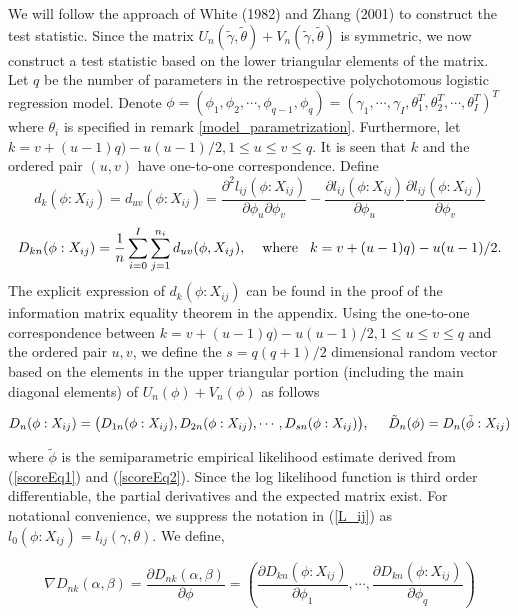 \documentclass[12]{interact}
\theoremstyle{plain}%
\theoremstyle{definition}
\theoremstyle{remark}
\begin{document}
We will follow the approach of White (1982) and Zhang (2001) to
construct the test statistic. Since the matrix
$U_n(\tilde{\gamma},\tilde{\theta})+V_n(\tilde{\gamma},\tilde{\theta})$
is symmetric, we now construct a test statistic based on the lower
triangular elements of the matrix. Let $q$ be the number of
parameters in the retrospective polychotomous logistic regression model. Denote
$\phi=(\phi_1, \phi_2, \cdots, \phi_{q-1}, \phi_q)=(\gamma_1,
\cdots, \gamma_I,\theta_1^T, \theta_2^T, \cdots,
\theta_{I}^T)^T$ where $\theta_i$ is specified in remark \ref{model_parametrization}.
Furthermore, let $k=v+(u-1)q)-u(u-1)/2, 1\le u\le v\le q$. It is seen that $k$ and the ordered pair $(u, v)$ have one-to-one correspondence. Define
\begin{equation}
	d_{k}(\phi: X_{ij})=d_{uv}(\phi: X_{ij})=\frac{\partial^2l_{ij}(\phi:X_{ij})}{\partial
		\phi_u\partial \phi_v}-\frac{\partial
		l_{ij}(\phi:X_{ij})}{\partial\phi_u} \frac{\partial l_{ij}(\phi :
		X_{ij})}{\partial \phi_v}\label{cell-difference}
\end{equation}
$$D_{kn}(\phi:X_{ij})=
\frac{1}{n}\sum_{i=0}^I\sum_{j=1}^{n_i}d_{uv}(\phi, X_{ij}), \hspace{4mm}\mbox{where}\hspace{3mm} k=v+(u-1)q)-u(u-1)/2.$$
The explicit expression of $d_{k}(\phi:X_{ij})$ can be found in the proof of the information matrix equality theorem in the appendix. Using the one-to-one correspondence between $k=v+(u-1)q)-u(u-1)/2, 1\le u\le v\le q$ and the ordered pair $u,v$, we define the $s=q(q+1)/2$ dimensional random vector based on the elements in the upper triangular portion (including the main diagonal elements) of $U_n(\phi) + V_n(\phi)$ as follows

\begin{equation}
	D_n(\phi: X_{ij})=\big(D_{1n}(\phi: X_{ij}),
	D_{2n}(\phi: X_{ij}),\cdots, D_{sn}(\phi: X_{ij})\big),
	\hspace{5mm} \tilde{D}_n(\phi)=D_n(\tilde{\phi}: X_{ij})
\end{equation}

where $\tilde{\phi}$ is the semiparametric empirical likelihood estimate derived from (\ref{scoreEq1}) and (\ref{scoreEq2}). Since the log likelihood function is third order differentiable, the partial derivatives and the expected matrix exist. For notational convenience, we suppress the notation in (\ref{L_ij}) as $l_0(\phi:X_{ij})=l_{ij}(\gamma, \theta)$. We define,

\begin{equation}
	\nabla D_{nk}(\alpha,\beta)=\frac{\partial
		D_{nk}(\alpha,\beta)}{\partial \phi}=\left(\frac{\partial D_{kn}(\phi: X_{ij})}{\partial \phi_1}, \cdots,  \frac{\partial D_{kn}(\phi: X_{ij})}{\partial \phi_q} \right)
\end{equation}
\end{document}
